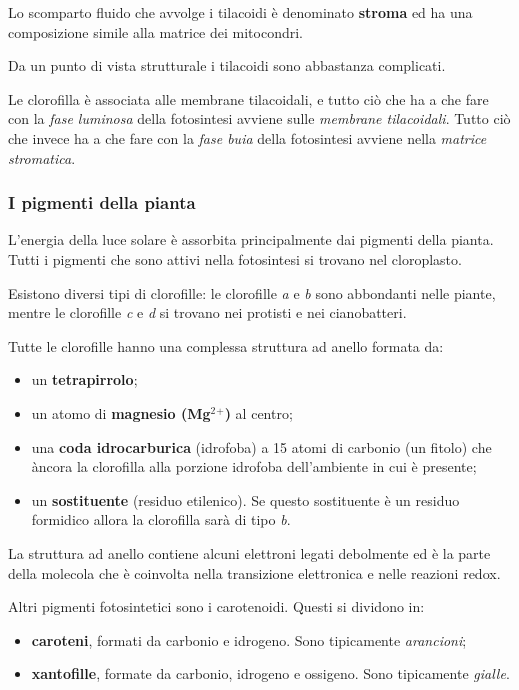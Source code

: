 \documentclass[]{article}
\begin{document}
Lo scomparto fluido che avvolge i tilacoidi è denominato \textbf{stroma}
ed ha una composizione simile alla matrice dei mitocondri.

Da un punto di vista strutturale i tilacoidi sono abbastanza complicati.

Le clorofilla è associata alle membrane tilacoidali, e tutto ciò che ha
a che fare con la \emph{fase luminosa} della fotosintesi avviene sulle
\emph{membrane tilacoidali}. Tutto ciò che invece ha a che fare con la
\emph{fase buia} della fotosintesi avviene nella \emph{matrice
stromatica}.

\subsubsection{I pigmenti della pianta}\label{i-pigmenti-della-pianta}

L'energia della luce solare è assorbita principalmente dai pigmenti
della pianta. Tutti i pigmenti che sono attivi nella fotosintesi si
trovano nel cloroplasto.

Esistono diversi tipi di clorofille: le clorofille \emph{a} e \emph{b}
sono abbondanti nelle piante, mentre le clorofille \emph{c} e \emph{d}
si trovano nei protisti e nei cianobatteri.

Tutte le clorofille hanno una complessa struttura ad anello formata da:

\begin{itemize}
\itemsep1pt\parskip0pt
\item
  un \textbf{tetrapirrolo};
\item
  un atomo di \textbf{magnesio (Mg$^2$$^+$)} al centro;
\item
  una \textbf{coda idrocarburica} (idrofoba) a 15 atomi di carbonio (un
  fitolo) che àncora la clorofilla alla porzione idrofoba dell'ambiente
  in cui è presente;
\item
  un \textbf{sostituente} (residuo etilenico). Se questo sostituente è
  un residuo formidico allora la clorofilla sarà di tipo \emph{b}.
\end{itemize}

La struttura ad anello contiene alcuni elettroni legati debolmente ed è
la parte della molecola che è coinvolta nella transizione elettronica e
nelle reazioni redox.

Altri pigmenti fotosintetici sono i carotenoidi. Questi si dividono in:

\begin{itemize}
\itemsep1pt\parskip0pt
\item
  \textbf{caroteni}, formati da carbonio e idrogeno. Sono tipicamente
  \emph{arancioni};
\item
  \textbf{xantofille}, formate da carbonio, idrogeno e ossigeno. Sono
  tipicamente \emph{gialle}.
\end{itemize}
\end{document}
